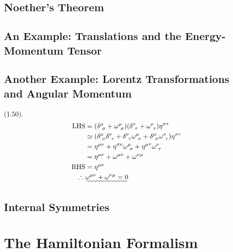 \subsection{Noether's Theorem} %
\label{sub:Noether's Theorem}

\subsection{An Example: Translations and the Energy-Momentum Tensor} %
\label{sub:An Example: Translations and the Energy-Momentum Tensor}

\subsection{Another Example: Lorentz Transformations and Angular Momentum} %
\label{sub:Another Example: Lorentz Transformations and Angular Momentum}
(1.50).
\begin{align}
    \text{LHS} &= \qty(\delta^{\mu}_{\ \sigma}+\omega^{\mu}_{\ \sigma})\qty(\delta^{\nu}_{\ \tau}+\omega^{\nu}_{\ \tau})\eta^{\sigma\tau} \notag \\
    &\simeq \qty(\delta^{\mu}_{\ \sigma}\delta^{\nu}_{\ \tau}+\delta^{\nu}_{\ \tau}\omega^{\mu}_{\ \sigma}+\delta^{\mu}_{\ \sigma}\omega^{\nu}_{\ \tau})\eta^{\sigma\tau} \notag \\
    &= \eta^{\mu\nu}+\eta^{\sigma\nu}\omega^{\mu}_{\ \sigma}+\eta^{\mu\tau}\omega^{\nu}_{\ \tau} \notag \\
    &= \eta^{\mu\nu}+\omega^{\mu\nu}+\omega^{\nu\mu} \notag \\
    \text{RHS} &= \eta^{\mu\nu} \notag \\
    \therefore\ &\uwave{\omega^{\mu\nu}+\omega^{\nu\mu}=0} \notag
\end{align}
\subsection{Internal Symmetries} %
\label{sub:Internal Symmetries}


\section{The Hamiltonian Formalism} %
\label{sec:The Hamiltonian Formalism}

